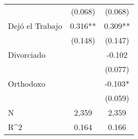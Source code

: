 \begin{table}
{\begin{threeparttable}
\begin{tabular}{lcc}
                    &     (0.068)   &     (0.068)   \\
Dejó el Trabajo     &       0.316** &       0.309** \\
                    &     (0.148)   &     (0.147)   \\
Divorciado          &               &      -0.102   \\
                    &               &     (0.077)   \\
Orthodoxo           &               &      -0.103*  \\
                    &               &     (0.059)   \\
\midrule
N                   &       2,359   &       2,359   \\
R^2                 &       0.164   &       0.166   \\
\hline
\end{tabular}
\begin{tablenotes}
\begin{footnotesize}
\end{footnotesize}
\end{tablenotes} \end{threeparttable} } \end{table}
